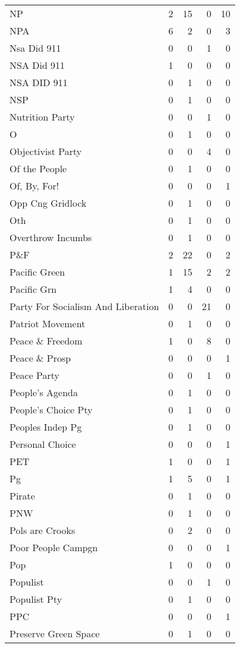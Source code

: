 \begin{supertabular}{lrrrr}
NP & 2 & 15 & 0 & 10\\
NPA & 6 & 2 & 0 & 3\\
Nsa Did 911 & 0 & 0 & 1 & 0\\
NSA Did 911 & 1 & 0 & 0 & 0\\
NSA DID 911 & 0 & 1 & 0 & 0\\
NSP & 0 & 1 & 0 & 0\\
Nutrition Party & 0 & 0 & 1 & 0\\
O & 0 & 1 & 0 & 0\\
Objectivist Party & 0 & 0 & 4 & 0\\
Of the People & 0 & 1 & 0 & 0\\
Of, By, For! & 0 & 0 & 0 & 1\\
Opp Cng Gridlock & 0 & 1 & 0 & 0\\
Oth & 0 & 1 & 0 & 0\\
Overthrow Incumbs & 0 & 1 & 0 & 0\\
P\&F & 2 & 22 & 0 & 2\\
Pacific Green & 1 & 15 & 2 & 2\\
Pacific Grn & 1 & 4 & 0 & 0\\
Party For Socialism And Liberation & 0 & 0 & 21 & 0\\
Patriot Movement & 0 & 1 & 0 & 0\\
Peace \& Freedom & 1 & 0 & 8 & 0\\
Peace \& Prosp & 0 & 0 & 0 & 1\\
Peace Party & 0 & 0 & 1 & 0\\
People's Agenda & 0 & 1 & 0 & 0\\
People's Choice Pty & 0 & 1 & 0 & 0\\
Peoples Indep Pg & 0 & 1 & 0 & 0\\
Personal Choice & 0 & 0 & 0 & 1\\
PET & 1 & 0 & 0 & 1\\
Pg & 1 & 5 & 0 & 1\\
Pirate & 0 & 1 & 0 & 0\\
PNW & 0 & 1 & 0 & 0\\
Pols are Crooks & 0 & 2 & 0 & 0\\
Poor People Campgn & 0 & 0 & 0 & 1\\
Pop & 1 & 0 & 0 & 0\\
Populist & 0 & 0 & 1 & 0\\
Populist Pty & 0 & 1 & 0 & 0\\
PPC & 0 & 0 & 0 & 1\\
Preserve Green Space & 0 & 1 & 0 & 0\\

\end{supertabular}
